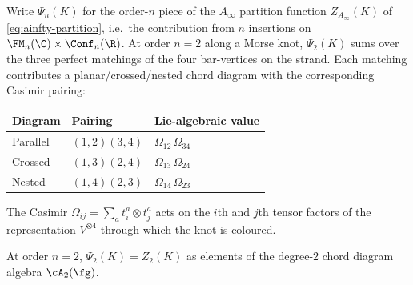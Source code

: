 Write $\Psi_n(K)$ for the order-$n$ piece of the $A_\infty$ partition
function $Z_{A_\infty}(K)$ of \eqref{eq:ainfty-partition}, i.e.\ the
contribution from $n$ insertions on $\FM_n(\C)\times\Conf_n(\R)$.
At order $n=2$ along a Morse knot, $\Psi_2(K)$ sums over the three
perfect matchings of the four bar-vertices on the strand. Each
matching contributes a planar/crossed/nested chord diagram with the
corresponding Casimir pairing:
\begin{center}
\renewcommand{\arraystretch}{1.3}
\begin{tabular}{lll}
\textbf{Diagram} & \textbf{Pairing} & \textbf{Lie-algebraic value} \\
\hline
Parallel &
 $(1,2)(3,4)$ &
 $\Omega_{12}\,\Omega_{34}$ \\
Crossed &
 $(1,3)(2,4)$ &
 $\Omega_{13}\,\Omega_{24}$ \\
Nested &
 $(1,4)(2,3)$ &
 $\Omega_{14}\,\Omega_{23}$
\end{tabular}
\end{center}
The Casimir $\Omega_{ij} = \sum_a t^a_i\otimes t^a_j$ acts on the
$i$th and $j$th tensor factors of the representation $V^{\otimes 4}$
through which the knot is coloured.

\begin{proposition}
\label{prop:order-2-match}
At order $n = 2$, $\Psi_2(K) = Z_2(K)$ as elements of
the degree-$2$ chord diagram algebra $\cA_2(\fg)$.
\end{proposition}

